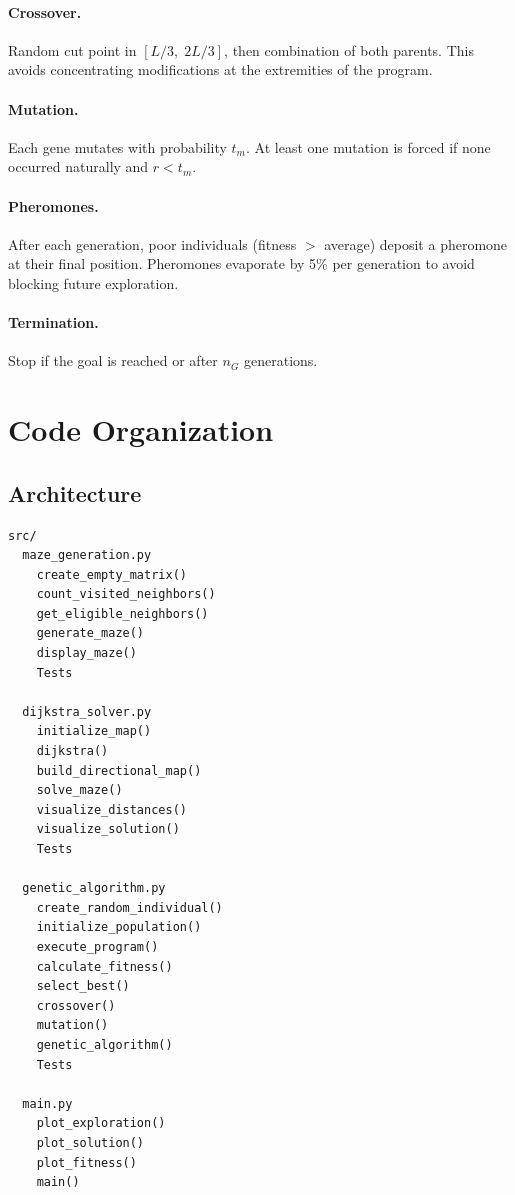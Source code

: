 \documentclass[12pt, a4paper]{article}
\theoremstyle{definition}
\begin{document}
\paragraph{Crossover.}
Random cut point in $[L/3,\; 2L/3]$, then combination of both parents.
This avoids concentrating modifications at the extremities of the program.

\paragraph{Mutation.}
Each gene mutates with probability $t_m$. At least one mutation is forced if none
occurred naturally and $r < t_m$.

\paragraph{Pheromones.}
After each generation, poor individuals (fitness $>$ average) deposit a pheromone at
their final position. Pheromones evaporate by 5\% per generation to avoid blocking
future exploration.

\paragraph{Termination.}
Stop if the goal is reached or after $n_G$ generations.

\section{Code Organization}

\subsection{Architecture}

\begin{lstlisting}
src/
  maze_generation.py
    create_empty_matrix()
    count_visited_neighbors()
    get_eligible_neighbors()
    generate_maze()
    display_maze()
    Tests

  dijkstra_solver.py
    initialize_map()
    dijkstra()
    build_directional_map()
    solve_maze()
    visualize_distances()
    visualize_solution()
    Tests

  genetic_algorithm.py
    create_random_individual()
    initialize_population()
    execute_program()
    calculate_fitness()
    select_best()
    crossover()
    mutation()
    genetic_algorithm()
    Tests

  main.py
    plot_exploration()
    plot_solution()
    plot_fitness()
    main()
\end{lstlisting}
\end{document}
